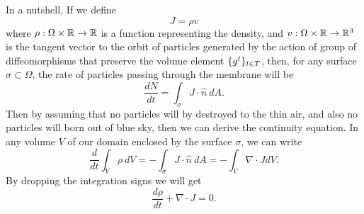 \begin{summary}
	In a nutshell, If we define 
	\[  J = \rho v \]
	where $ \rho :\Omega \times \mathbb{R} \to \mathbb{R} $ is a function representing the density, and $ v: \Omega \times \mathbb{R} \to \mathbb{R}^3 $ is the tangent vector to the orbit of particles generated by the action of group of diffeomorphisms that preserve the volume element $ \{g^t\}_{t\in T} $, then, for any surface $ \sigma \subset \Omega $, the rate of particles passing through the membrane will be
	\[ \frac{dN}{dt} = \int_\sigma J\cdot \hat{n}\ dA. \]
	Then by assuming that no particles will by destroyed to the thin air, and also no particles will born out of blue sky, then we can derive the continuity equation. In any volume $ V $ of our domain enclosed by the surface $ \sigma $, we can write
	\[ \frac{d}{dt} \int_V \rho\ dV = - \int_\sigma J\cdot \hat{n}\ dA = - \int_V \nabla\cdot J dV. \]
	By dropping the integration signs we will get
	\[ \frac{d\rho}{dt} + \nabla\cdot J = 0.  \]
\end{summary}